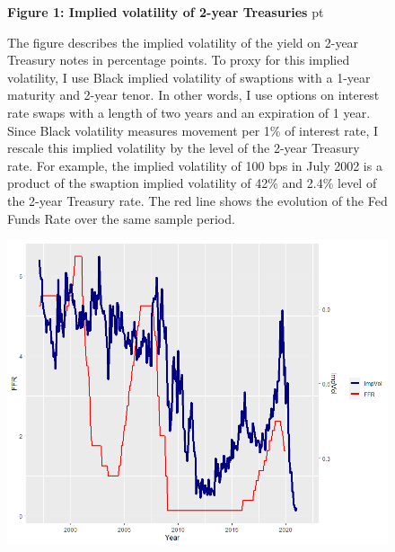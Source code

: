 \documentclass[12pt]{article}
\begin{document}
\begin{figure}[h!]
\textbf{Figure 1: Implied volatility of 2-year Treasuries}
 pt
\begin{flushleft}
{The figure describes the implied volatility of the yield on 2-year Treasury notes in percentage points. To proxy for this implied volatility, I use Black implied volatility of swaptions with a 1-year maturity and 2-year tenor. In other words, I use options on interest rate swaps with a length of two years and an expiration of 1 year. Since Black volatility measures movement per 1\% of interest rate, I rescale this implied volatility by the level of the 2-year Treasury rate. For example, the implied volatility of 100 bps in July 2002 is a product of the swaption implied volatility of 42\% and 2.4\% level of the 2-year Treasury rate. The red line shows the evolution of the Fed Funds Rate over the same sample period.}
\end{flushleft}
\centering
\vspace{0.64cm}
\includegraphics[width=1\textwidth]{images/imvol_ffr_plot.png}

\end{figure}
\end{document}
